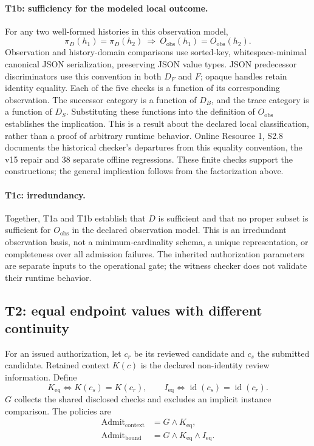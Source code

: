 \paragraph{T1b: sufficiency for the modeled local outcome.}
For any two well-formed histories in this observation model,
\[
 \pi_D(h_1)=\pi_D(h_2)
 \ \Longrightarrow\
 O_{\mathrm{obs}}(h_1)=O_{\mathrm{obs}}(h_2).
\]
Observation and history-domain comparisons use sorted-key, whitespace-minimal canonical JSON serialization, preserving JSON value types. JSON predecessor discriminators use this convention in both $D_F$ and $F$; opaque handles retain identity equality. Each of the five checks is a function of its corresponding observation. The successor category is a function of $D_B$, and the trace category is a function of $D_S$. Substituting these functions into the definition of $O_{\mathrm{obs}}$ establishes the implication. This is a result about the declared local classification, rather than a proof of arbitrary runtime behavior. Online Resource 1, S2.8 documents the historical checker's departures from this equality convention, the v15 repair and 38 separate offline regressions. These finite checks support the constructions; the general implication follows from the factorization above.

\paragraph{T1c: irredundancy.}
Together, T1a and T1b establish that $D$ is sufficient and that no proper subset is sufficient for $O_{\mathrm{obs}}$ in the declared observation model. This is an irredundant observation basis, not a minimum-cardinality schema, a unique representation, or completeness over all admission failures. The inherited authorization parameters are separate inputs to the operational gate; the witness checker does not validate their runtime behavior.

\subsection{T2: equal endpoint values with different continuity}
\label{app:t2}
For an issued authorization, let $c_r$ be its reviewed candidate and $c_s$ the submitted candidate. Retained context $K(c)$ is the declared non-identity review information. Define
\[
 K_{\mathrm{eq}}\iff K(c_s)=K(c_r),
 \qquad
 I_{\mathrm{eq}}\iff \operatorname{id}(c_s)=\operatorname{id}(c_r).
\]
$G$ collects the shared disclosed checks and excludes an implicit instance comparison. The policies are
\[
 \begin{aligned}
 \operatorname{Admit}_{\mathrm{context}}&=G\land K_{\mathrm{eq}},\\
 \operatorname{Admit}_{\mathrm{bound}}&=G\land K_{\mathrm{eq}}\land I_{\mathrm{eq}}.
 \end{aligned}
\]

